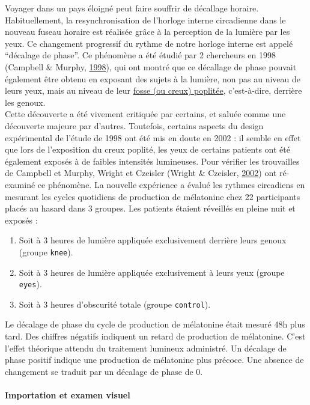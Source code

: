 \documentclass[
  a4paper,
]{article}
\providecommand{\tightlist}{%
  \setlength{\itemsep}{0pt}\setlength{\parskip}{0pt}}
\begin{document}
Voyager dans un pays éloigné peut faire souffrir de décallage horaire. Habituellement, la resynchronisation de l'horloge interne circadienne dans le nouveau fuseau horaire est réalisée grâce à la perception de la lumière
par les yeux. Ce changement progressif du rythme de notre horloge interne est appelé ``décalage de phase''. Ce phénomène a été étudié par 2 chercheurs en 1998 (Campbell \& Murphy, \protect\hyperlink{ref-Campbell1998}{1998}), qui ont montré que ce décallage de phase pouvait également être obtenu en exposant des sujets à la lumière, non pas au niveau de leurs yeux, mais au niveau de leur \href{https://fr.wikipedia.org/wiki/Fosse_poplitée}{fosse (ou creux) poplitée}, c'est-à-dire, derrière les genoux.\\
Cette découverte a été vivement critiquée par certains, et saluée comme une découverte majeure par d'autres. Toutefois, certains aspects du design expérimental de l'étude de 1998 ont été mis en doute en 2002 : il semble en effet que lors de l'exposition du creux poplité, les yeux de certains patients ont été également exposés à de faibles intensités lumineuses. Pour vérifier les trouvailles de Campbell et Murphy, Wright et Czeisler (Wright \& Czeisler, \protect\hyperlink{ref-Wright2002}{2002}) ont ré-examiné ce phénomène. La nouvelle expérience a évalué les rythmes circadiens en mesurant les cycles quotidiens de production de mélatonine chez 22 participants placés au hasard dans 3 groupes. Les patients étaient réveillés en pleine nuit et exposés :

\begin{enumerate}
\def\labelenumi{\arabic{enumi}.}
\tightlist
\item
  Soit à 3 heures de lumière appliquée exclusivement derrière leurs genoux (groupe \texttt{knee}).
\item
  Soit à 3 heures de lumière appliquée exclusivement à leurs yeux (groupe \texttt{eyes}).
\item
  Soit à 3 heures d'obscurité totale (groupe \texttt{control}).
\end{enumerate}

Le décalage de phase du cycle de production de mélatonine était mesuré 48h plus tard. Des chiffres négatifs indiquent un retard de production de mélatonine. C'est l'effet théorique attendu du traitement lumineux administré. Un décalage de phase positif indique une production de mélatonine plus précoce. Une absence de changement se traduit par un décalage de phase de 0.

\hypertarget{importation-et-examen-visuel-3}{%
\paragraph{Importation et examen visuel}\label{importation-et-examen-visuel-3}}
\end{document}
